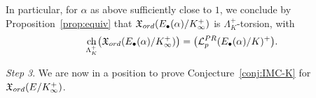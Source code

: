 \documentclass[a4paper,10pt]{amsart}
\numberwithin{equation}{section}
\numberwithin{equation}{section}
\theoremstyle{plain}
\theoremstyle{definition}
\theoremstyle{definition}
\theoremstyle{plain}
\newtheorem{prop}[thm]{Proposition}
\theoremstyle{plain}
\theoremstyle{plain}
\theoremstyle{plain}
\newcommand{\X}{\mathfrak{X}}
\newcommand{\sk}{\vspace{0.1in}}
\DeclareMathOperator{\ch}{ch}
\newcommand{\Lcal}{\mathcal{L}}
\newcommand{\Fcal}{\mathcal{F}}
\begin{document}
In particular, for $\alpha$ as above sufficiently close to $1$, we conclude by Proposition~\ref{prop:equiv} that $\X_{\rm ord}(E_\bullet(\alpha)/K_\infty^+)$ is $\Lambda_K^+$-torsion, with
\begin{equation}\label{eq:alpha-equality}
\ch_{\Lambda_K^+}\bigl(\X_{\rm ord}(E_\bullet(\alpha)/K_\infty^+)\bigr)=\bigl(\Lcal_p^{\rm PR}(E_\bullet(\alpha)/K)^+\bigr).
\end{equation}

\noindent\emph{Step 3}. 
%
%
%
%
We are now in a position to prove Conjecture~\ref{conj:IMC-K} for $\X_{\rm ord}(E/K_\infty^+)$.
\end{document}
